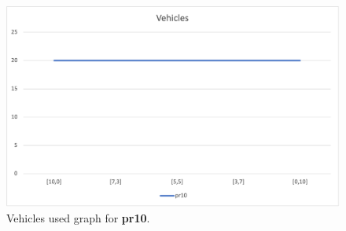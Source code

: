 \begin{figure}[H]
    \centering
    \includegraphics[height=0.25\textheight]{../graphs/pr10-vehicles.png}
    \caption{Vehicles used graph for \textbf{pr10}.}
\end{figure}

\newpage